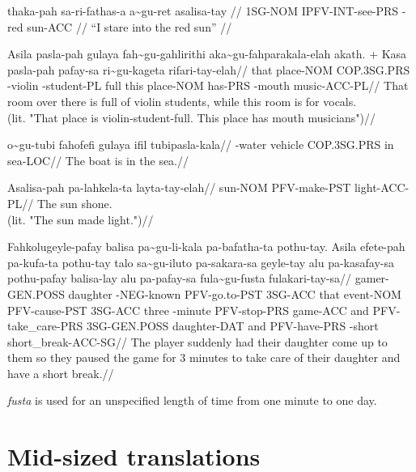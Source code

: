 \ex
\begingl
\gla thaka-pah sa-ri-fathas-a   a\~{}gu-ret   asalisa-tay //
\glb 1SG-NOM   IPFV-INT-see-PRS \agradj{}-red sun-ACC //
\glft ``I stare into the red sun'' //
\endgl
\xe

\ex
\begingl
\gla Asila pasla-pah gulaya      fah\~{}gu-gahlirithi aka\~{}gu-fahparakala-elah akath.
+ Kasa pasla-pah pafay-sa ri\~{}gu-kageta  rifari-tay-elah//
\glb that  place-NOM COP.3SG.PRS \agradj{}-violin    \agradj{}-student-PL      full   this place-NOM has-PRS  \agradj{}-mouth music-ACC-PL//
\glft That room over there is full of violin students, while this room is for vocals. \\
     (lit. "That place is violin-student-full. This place has mouth musicians")//
\endgl
\xe

\ex
\begingl
\gla  o\~{}gu-tubi    fahofefi gulaya      ifil tubipasla-kala//
\glb  \agradj{}-water vehicle  COP.3SG.PRS in   sea-LOC//
\glft The boat is in the sea.//
\endgl
\xe

\ex
\begingl
\gla  Asalisa-pah pa-lahkela-ta layta-tay-elah//
\glb  sun-NOM     PFV-make-PST  light-ACC-PL//
\glft The sun shone. \\
      (lit. "The sun made light.")//
\endgl
\xe

\ex
\begingl 
\gla  Fahkolugeyle-pafay balisa   pa\~{}gu-li-kala     pa-bafatha-ta pothu-tay. Asila efete-pah pa-kufa-ta    pothu-tay talo  sa\~{}gu-iluto   pa-sakara-sa geyle-tay alu pa-kasafay-sa      pothu-pafay  balisa-lay   alu pa-pafay-sa  fula\~{}gu-fusta              fulakari-tay-sa//
\glb  gamer-GEN.POSS     daughter \agradj{}-NEG-known  PFV-go.to-PST 3SG-ACC    that  event-NOM PFV-cause-PST 3SG-ACC   three \agradj{}-minute PFV-stop-PRS game-ACC  and PFV-take\_care-PRS 3SG-GEN.POSS daughter-DAT and PFV-have-PRS \agradj{}-short short\_break-ACC-SG//
\glft The player suddenly had their daughter come up to them so they paused the game for 3 minutes to take care of their daughter and have a short break.//
\endgl
\xe

\textit{fusta} is used for an unspecified length of time from one minute to one day.



\chapter{Mid-sized translations}

\newpage

\newpage


\newpage
